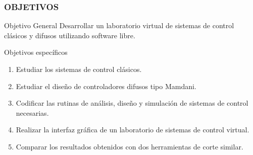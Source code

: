 \documentclass[usenames,dvipsnames]{beamer}
\begin{document}
\begin{frame}
	\frametitle{OBJETIVOS}
	\vspace{20pt}
	\begin{block}{Objetivo General}
		Desarrollar un laboratorio virtual de sistemas de control clásicos y difusos utilizando software libre.
	\end{block}
	
	\begin{block}{Objetivos específicos}
		\begin{enumerate} 
			\item Estudiar los sistemas de control clásicos.
			\item Estudiar el diseño de controladores difusos tipo Mamdani.
			\item Codificar las rutinas de análisis, diseño y simulación de sistemas de control necesarias.
			\item Realizar la interfaz gráfica de un laboratorio de sistemas de control virtual.
			\item Comparar los resultados obtenidos con dos herramientas de corte similar.
		\end{enumerate}
	\end{block}
	
\end{frame}
\end{document}
